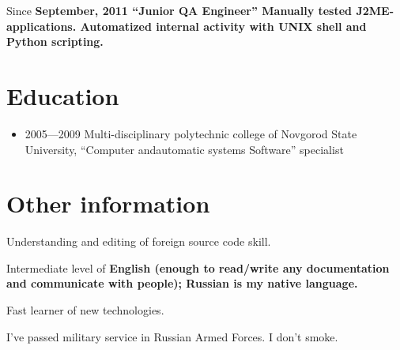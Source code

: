 \vspace{15pt}
\subitem Since \bfseries September, 2011 \mdseries ``Junior QA Engineer''
\subitem Manually tested J2ME-applications.
\subitem Automatized internal activity with
\bfseries UNIX shell \mdseries and \bfseries Python \mdseries scripting.

\section{Education}
\begin{itemize}
\item 2005---2009 Multi-disciplinary polytechnic college of
Novgorod State University,
``Computer and\linebreak automatic systems Software'' specialist
\end{itemize}

\section{Other information}
Understanding and editing of foreign source code skill.

Intermediate level of \bfseries English \mdseries
(enough to read/write any documentation and communicate with people);
Russian is my native language.

Fast learner of new technologies.

I've passed military service in Russian Armed Forces.
I don't smoke.

